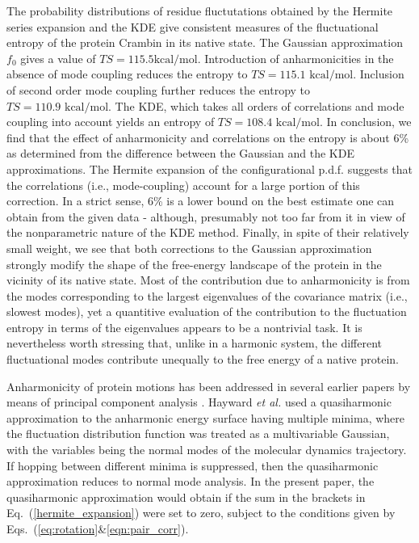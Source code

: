 \documentclass[12pt,article]{iopart}
\begin{document}
The probability distributions of residue fluctutations obtained by the
Hermite series expansion and the KDE give consistent measures of the
fluctuational entropy of the protein Crambin in its native state. The
Gaussian approximation $f_0$ gives a value of $TS = 115.5 \mbox{
  kcal/mol}$.  Introduction of anharmonicities in the absence of mode
coupling reduces the entropy to $TS = 115.1 \mbox{ kcal/mol}$.
Inclusion of second order mode coupling further reduces the entropy to
$TS=110.9 \mbox{ kcal/mol}$.  The KDE, which takes all orders of
correlations and mode coupling into account yields an entropy of $TS =
108.4 \mbox{ kcal/mol}$.  In conclusion, we find that the effect of
anharmonicity and correlations on the entropy is about 6\% as
determined from the difference between the Gaussian and the KDE
approximations. The Hermite expansion of the configurational
p.d.f. suggests that the correlations (i.e., mode-coupling) account
for a large portion of this correction. In a strict sense, 6\% is a
lower bound on the best estimate one can obtain from the given data -
although, presumably not too far from it in view of the nonparametric
nature of the KDE method. Finally, in spite of their relatively small
weight, we see that both corrections to the Gaussian approximation
strongly modify the shape of the free-energy landscape of the protein
in the vicinity of its native state. Most of the contribution due to
anharmonicity is from the modes corresponding to the largest
eigenvalues of the covariance matrix (i.e., slowest modes), yet a
quantitive evaluation of the contribution to the fluctuation entropy
in terms of the eigenvalues appears to be a nontrivial task. It is
nevertheless worth stressing that, unlike in a harmonic system, the
different fluctuational modes contribute unequally to the free energy
of a native protein.

Anharmonicity of protein motions has been addressed in several earlier
papers by means of principal component analysis
\cite{hayward1994harmonic,maisuradze2007free,maisuradze2009adequate,altis2008construction}. Hayward{\it
  et al.}\cite{hayward1994harmonic} used a quasiharmonic approximation
to the anharmonic energy surface having multiple minima, where the
fluctuation distribution function was treated as a multivariable
Gaussian, with the variables being the normal modes of the molecular
dynamics trajectory. If hopping between different minima is
suppressed, then the quasiharmonic approximation reduces to normal
mode analysis. In the present paper, the quasiharmonic approximation
would obtain if the sum in the brackets in
Eq.~(\ref{hermite_expansion}) were set to zero, subject to the
conditions given by Eqs.~(\ref{eq:rotation}\&\ref{eqn:pair_corr}).
\end{document}

